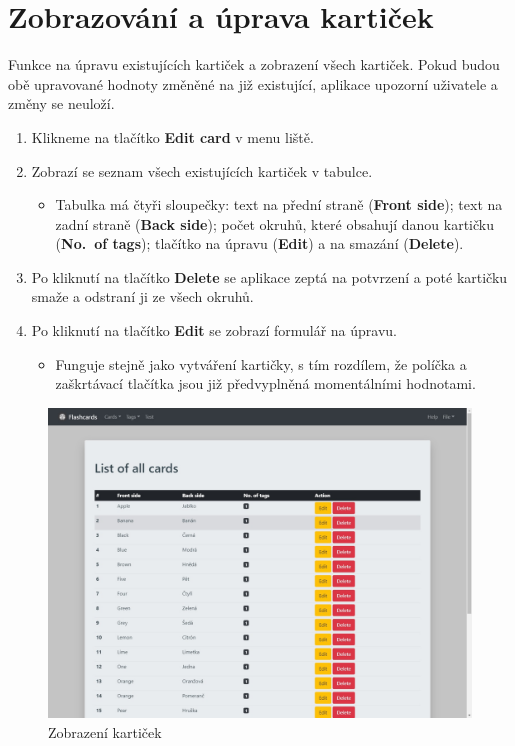\documentclass[11pt]{article}
\providecommand{\tightlist}{\setlength{\itemsep}{1pt}\setlength{\parskip}{1pt}}
\begin{document}
\hypertarget{zobrazovuxe1nuxed-a-uxfaprava-kartiux10dek}{%
\section{Zobrazování a úprava
kartiček}\label{zobrazovuxe1nuxed-a-uxfaprava-kartiux10dek}}

Funkce na úpravu existujících kartiček a zobrazení všech kartiček. Pokud
budou obě upravované hodnoty změněné na již existující, aplikace
upozorní uživatele a změny se neuloží.

\begin{enumerate}
\def\labelenumi{\arabic{enumi}.}
\tightlist
\item
  Klikneme na tlačítko \textbf{Edit card} v menu liště.
\item
  Zobrazí se seznam všech existujících kartiček v tabulce.

  \begin{itemize}
  \tightlist
  \item
    Tabulka má čtyři sloupečky: text na přední straně (\textbf{Front
    side}); text na zadní straně (\textbf{Back side}); počet okruhů,
    které obsahují danou kartičku (\textbf{No.~of tags}); tlačítko na
    úpravu (\textbf{Edit}) a na smazání (\textbf{Delete}).
  \end{itemize}
\item
  Po kliknutí na tlačítko \textbf{Delete} se aplikace zeptá na potvrzení
  a poté kartičku smaže a odstraní ji ze všech okruhů.
\item
  Po kliknutí na tlačítko \textbf{Edit} se zobrazí formulář na úpravu.

  \begin{itemize}
  \tightlist
  \item
    Funguje stejně jako vytváření kartičky, s tím rozdílem, že políčka a
    zaškrtávací tlačítka jsou již předvyplněná momentálními hodnotami.
  \end{itemize}
\end{enumerate}

\begin{figure}
\centering
\includegraphics{assets/list_cards.jpg}
\caption{Zobrazení kartiček}
\end{figure}
\end{document}
